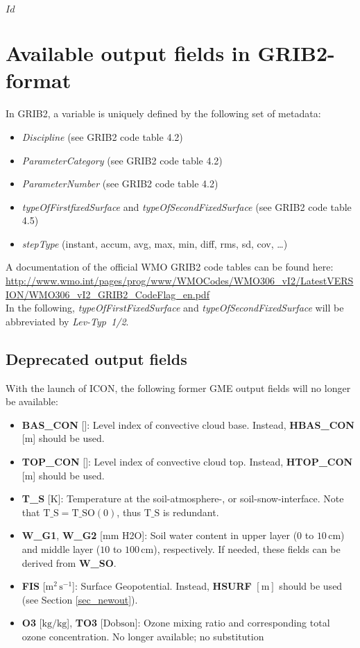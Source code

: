 \svnInfo $Id$
\chapter{Available output fields in GRIB2-format}


In GRIB2, a variable is uniquely defined by the following set of metadata:
\begin{itemize}
 \item \emph{Discipline} (see GRIB2 code table 4.2)
 \item \emph{ParameterCategory} (see GRIB2 code table 4.2)
 \item \emph{ParameterNumber} (see GRIB2 code table 4.2)
 \item \emph{typeOfFirstfixedSurface} and \emph{typeOfSecondFixedSurface} (see GRIB2 code table 4.5)
 \item \emph{stepType} (instant, accum, avg, max, min, diff, rms, sd, cov, \dots)
\end{itemize}
A documentation of the official WMO GRIB2 code tables can be found here: \url{http://www.wmo.int/pages/prog/www/WMOCodes/WMO306_vI2/LatestVERSION/WMO306_vI2_GRIB2_CodeFlag_en.pdf}\\
In the following, \emph{typeOfFirstFixedSurface} and \emph{typeOfSecondFixedSurface} will be abbreviated by \emph{Lev-Typ~1/2}.



\section{Deprecated output fields}
With the launch of ICON, the following former GME output fields will no longer be available:

\begin{itemize}
 \item \textbf{BAS\_CON} [\textendash]: Level index of convective cloud base. Instead, \textbf{HBAS\_CON} [m] should be used.
 \item \textbf{TOP\_CON} [\textendash]: Level index of convective cloud top. Instead, \textbf{HTOP\_CON} [m] should be used.
 \item \textbf{T\_S} [K]: Temperature at the soil-atmosphere-, or soil-snow-interface. Note that $\mathrm{T\_S} = \mathrm{T\_SO(0)}$, thus $\mathrm{T\_S}$ is redundant.
 \item \textbf{W\_G1}, \textbf{W\_G2}  [mm H2O]: Soil water content in upper layer ($0$ to $10\,\mathrm{cm}$) and middle layer ($10$ to $100\,\mathrm{cm}$), respectively. 
                                                 If needed, these fields can be derived from \textbf{W\_SO}.
 \item \textbf{FIS} [$\mathrm{m^{2}\,s^{-1}}$]: Surface Geopotential. Instead, \textbf{HSURF} $[\mathrm{m}]$ should be used (see Section \ref{sec_newout}).
 \item \textbf{O3} [$\mathrm{kg/kg}$], \textbf{TO3} [$\mathrm{Dobson}$]: Ozone mixing ratio and corresponding total ozone concentration. No longer available; no substitution
\end{itemize}



